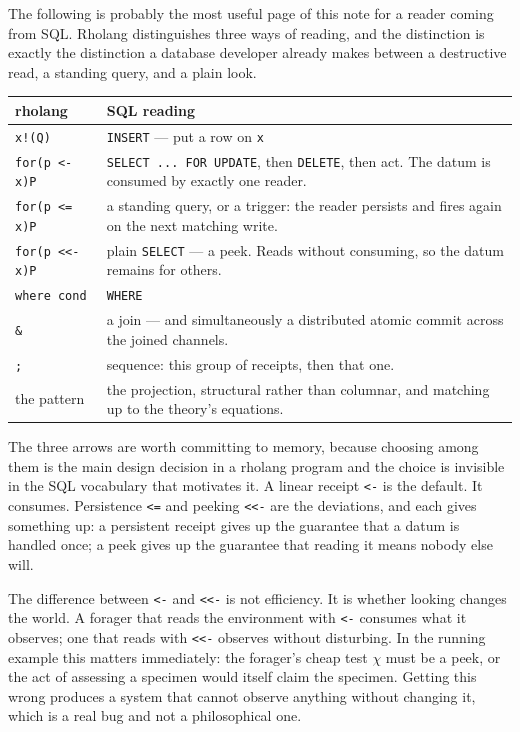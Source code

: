 The following is probably the most useful page of this note for a reader coming
from SQL. Rholang distinguishes three ways of reading, and the distinction is
exactly the distinction a database developer already makes between a destructive
read, a standing query, and a plain look.

\begin{center}
\small
\begin{tabular}{@{}L{0.36\textwidth}L{0.56\textwidth}@{}}
\toprule
\textbf{rholang} & \textbf{SQL reading} \\
\midrule
\texttt{x!(Q)} &
\texttt{INSERT} --- put a row on \texttt{x} \\[3pt]
\texttt{for(p <- x)P} &
\texttt{SELECT ... FOR UPDATE}, then \texttt{DELETE}, then act. The datum is
consumed by exactly one reader. \\[3pt]
\texttt{for(p <= x)P} &
a standing query, or a trigger: the reader persists and fires again on the
next matching write. \\[3pt]
\texttt{for(p <<- x)P} &
plain \texttt{SELECT} --- a peek. Reads without consuming, so the datum remains
for others. \\[3pt]
\texttt{where cond} &
\texttt{WHERE} \\[3pt]
\texttt{\&} &
a join --- and simultaneously a distributed atomic commit across the joined
channels. \\[3pt]
\texttt{;} &
sequence: this group of receipts, then that one. \\[3pt]
the pattern &
the projection, structural rather than columnar, and matching up to the
theory's equations. \\
\bottomrule
\end{tabular}
\end{center}

The three arrows are worth committing to memory, because choosing among them is
the main design decision in a rholang program and the choice is invisible in the
SQL vocabulary that motivates it. A linear receipt \texttt{<-} is the default.
It consumes. Persistence \texttt{<=} and peeking \texttt{<<-} are the deviations,
and each gives something up: a persistent receipt gives up the guarantee that a
datum is handled once; a peek gives up the guarantee that reading it means
nobody else will.

\begin{remark}
\label{rem:peek}
The difference between \texttt{<-} and \texttt{<<-} is not efficiency. It is
whether looking changes the world. A forager that reads the environment with
\texttt{<-} consumes what it observes; one that reads with \texttt{<<-} observes
without disturbing. In the running example this matters immediately: the
forager's cheap test $\chi$ must be a peek, or the act of assessing a specimen
would itself claim the specimen. Getting this wrong produces a system that
cannot observe anything without changing it, which is a real bug and not a
philosophical one.
\end{remark}

